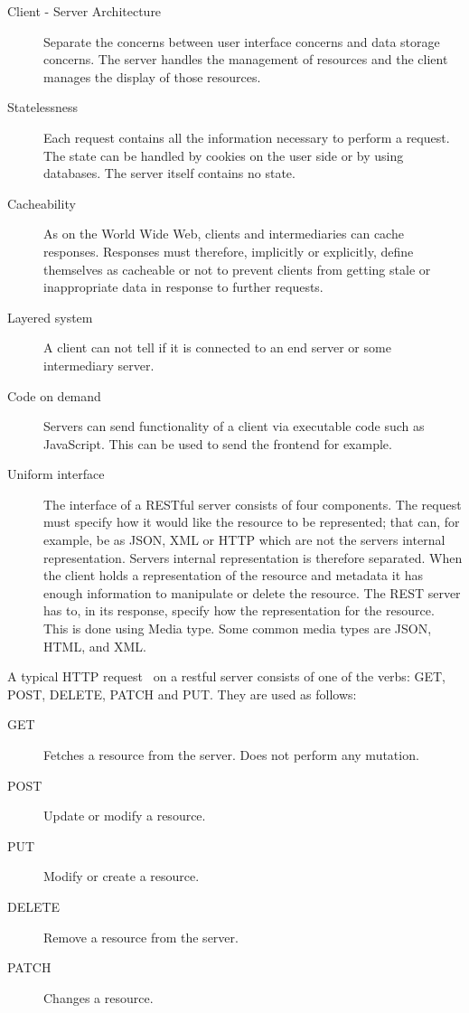 \begin{description}
\item[ Client - Server Architecture ] Separate the concerns between user
interface concerns and data storage concerns. The server handles the management
of resources and the client manages the display of those resources.
\item[Statelessness] Each request contains all the information necessary to
perform a request. The state can be handled by cookies on the user side or by using
databases. The server itself contains no state.
\item[Cacheability] As on the World Wide Web, clients and intermediaries can
cache responses. Responses must therefore, implicitly or explicitly, define
themselves as cacheable or not to prevent clients from getting stale or
inappropriate data in response to further requests. 
\item[Layered system] A client can not tell if it is connected to an end server
or some intermediary server. 
\item[Code on demand] Servers can send functionality of a client via executable
code such as JavaScript. This can be used to send the frontend for example.
\item[Uniform interface] The interface of a RESTful server consists of four
components. The request must specify how it would like the resource to be
represented; that can, for example, be as JSON, XML or HTTP which are not the
servers internal representation. Servers internal representation is therefore
separated. When the client holds a representation of the resource and metadata
it has enough information to manipulate or delete the resource. The REST
server has to, in its response, specify how the representation for the
resource. This is done using Media type. Some common media types are JSON, HTML,
and XML.
\end{description}

A typical HTTP request~\cite{fielding1996hypertext} on a restful server consists
of one of the  verbs: GET, POST, DELETE, PATCH and PUT. They are used as
follows:

\begin{description}
\item[GET] Fetches a resource from the server. Does not perform any mutation. 
\item[POST] Update or modify a resource.
\item[PUT] Modify or create a resource.
\item[DELETE] Remove a resource from the server.
\item[PATCH] Changes a resource.
\end{description}

